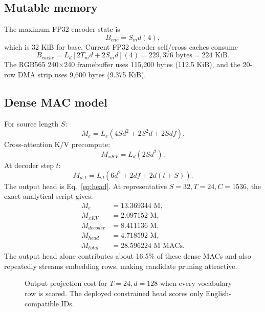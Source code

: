 \documentclass{article}
\begin{document}
\subsection{Mutable memory}
The maximum FP32 encoder state is
\begin{equation}
B_{enc}=S_md(4),
\end{equation}
which is 32 KiB for base. Current FP32 decoder self/cross caches consume
\begin{equation}
B_{cache}
=L_d[2T_md+2S_md](4)
=229{,}376\text{ bytes}
=224\text{ KiB}.
\end{equation}
The RGB565 240$\times$240 framebuffer uses 115,200 bytes (112.5 KiB), and the 20-row DMA strip uses 9,600 bytes (9.375 KiB).

\subsection{Dense MAC model}
For source length $S$:
\begin{equation}
M_e=L_e(4Sd^2+2S^2d+2Sdf).
\end{equation}
Cross-attention K/V precompute:
\begin{equation}
M_{xKV}=L_d(2Sd^2).
\end{equation}
At decoder step $t$:
\begin{equation}
M_{d,t}
=L_d(6d^2+2df+2d(t+S)).
\end{equation}
The output head is Eq.~\ref{eq:head}. At representative $S=32,T=24,C=1536$, the exact analytical script gives:
\begin{align}
M_e&=13.369344\text{ M},\\
M_{xKV}&=2.097152\text{ M},\\
M_{decoder}&=8.411136\text{ M},\\
M_{head}&=4.718592\text{ M},\\
M_{total}&=28.596224\text{ M MACs}.
\end{align}
The output head alone contributes about 16.5\% of these dense MACs and also repeatedly streams embedding rows, making candidate pruning attractive.

\begin{figure}[t]
\centering
{}
\caption{Output projection cost for $T=24,d=128$ when every vocabulary row is scored. The deployed constrained head scores only English-compatible IDs.}
\end{figure}
\end{document}
